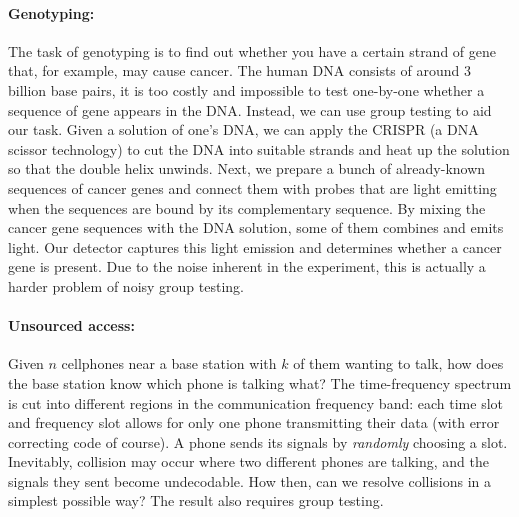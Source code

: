 \paragraph{Genotyping:} The task of genotyping is to find out whether you have a certain strand of gene that, for example, may cause cancer. The human DNA consists of around 3 billion base pairs, it is too costly and impossible to test one-by-one whether a sequence of gene appears in the DNA. Instead, we can use group testing to aid our task. Given a solution of one's DNA, we can apply the CRISPR (a DNA scissor technology) to cut the DNA into suitable strands and heat up the solution so that the double helix unwinds. Next, we prepare a bunch of already-known sequences of cancer genes and connect them with probes that are light emitting when the sequences are bound by its complementary sequence. By mixing the cancer gene sequences with the DNA solution, some of them combines and emits light. Our detector captures this light emission and determines whether a cancer gene is present. Due to the noise inherent in the experiment, this is actually a harder problem of noisy group testing.

\paragraph{Unsourced access:} Given $n$ cellphones near a base station with $k$ of them wanting to talk, how does the base station know which phone is talking what? The time-frequency spectrum is cut into different regions in the communication frequency band: each time slot and frequency slot allows for only one phone transmitting their data (with error correcting code of course). A phone sends its signals by \textit{randomly} choosing a slot. Inevitably, collision may occur where two different phones are talking, and the signals they sent become undecodable. How then, can we resolve collisions in a simplest possible way? The result also requires group testing.

